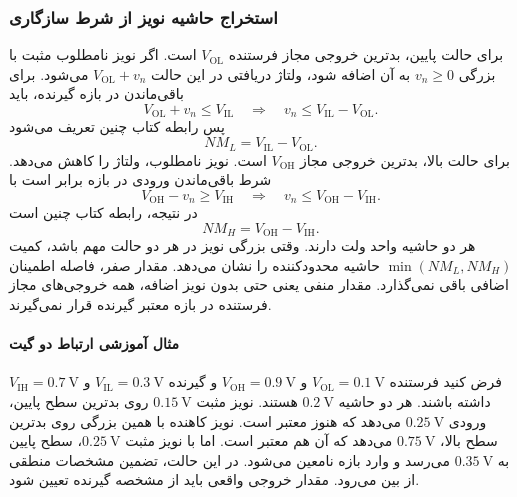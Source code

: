\subsubsection{استخراج حاشیه نویز از شرط سازگاری}
\label{sec:noise-margin-definition}
برای حالت پایین، بدترین خروجی مجاز فرستنده
\(V_{\mathrm{OL}}\) است. اگر نویز نامطلوب مثبت با بزرگی
\(v_n\ge0\) به آن اضافه شود، ولتاژ دریافتی در این حالت
\(V_{\mathrm{OL}}+v_n\) می‌شود. برای باقی‌ماندن در بازه
 گیرنده، باید
\begin{equation*}
 V_{\mathrm{OL}}+v_n\le V_{\mathrm{IL}}
 \quad\Longrightarrow\quad
 v_n\le V_{\mathrm{IL}}-V_{\mathrm{OL}}.
\end{equation*}
پس رابطه  کتاب چنین تعریف می‌شود
\begin{equation}
 \boxed{NM_L=V_{\mathrm{IL}}-V_{\mathrm{OL}}}.
 \label{eq:noise-low-margin}
\end{equation}
برای حالت بالا، بدترین خروجی مجاز
\(V_{\mathrm{OH}}\) است. نویز نامطلوب، ولتاژ را کاهش می‌دهد.
شرط باقی‌ماندن ورودی در بازه  برابر است با
\begin{equation*}
 V_{\mathrm{OH}}-v_n\ge V_{\mathrm{IH}}
 \quad\Longrightarrow\quad
 v_n\le V_{\mathrm{OH}}-V_{\mathrm{IH}}.
\end{equation*}
در نتیجه، رابطه  کتاب چنین است
\begin{equation}
 \boxed{NM_H=V_{\mathrm{OH}}-V_{\mathrm{IH}}}.
 \label{eq:noise-high-margin}
\end{equation}
هر دو حاشیه واحد ولت دارند. وقتی بزرگی نویز در هر دو حالت
مهم باشد، کمیت \(\min(NM_L,NM_H)\) حاشیه محدودکننده را
نشان می‌دهد. مقدار صفر، فاصله اطمینان اضافی باقی نمی‌گذارد.
مقدار منفی یعنی حتی بدون نویز اضافه، همه خروجی‌های مجاز
فرستنده در بازه معتبر گیرنده قرار نمی‌گیرند.

\paragraph*{مثال آموزشی ارتباط دو گیت}
فرض کنید فرستنده \(V_{\mathrm{OL}}=\qty{0.1}{\volt}\) و
\(V_{\mathrm{OH}}=\qty{0.9}{\volt}\) و گیرنده
\(V_{\mathrm{IL}}=\qty{0.3}{\volt}\) و
\(V_{\mathrm{IH}}=\qty{0.7}{\volt}\) داشته باشند.
هر دو حاشیه \(\qty{0.2}{\volt}\) هستند.
نویز مثبت \(\qty{0.15}{\volt}\) روی بدترین سطح پایین،
ورودی \(\qty{0.25}{\volt}\) می‌دهد که هنوز معتبر است.
نویز کاهنده با همین بزرگی روی بدترین سطح بالا،
\(\qty{0.75}{\volt}\) می‌دهد که آن هم معتبر است.
اما با نویز مثبت \(\qty{0.25}{\volt}\)، سطح پایین به
\(\qty{0.35}{\volt}\) می‌رسد و وارد بازه نامعین می‌شود.
در این حالت، تضمین مشخصات منطقی از بین می‌رود. مقدار خروجی
واقعی باید از مشخصه گیرنده تعیین شود.

